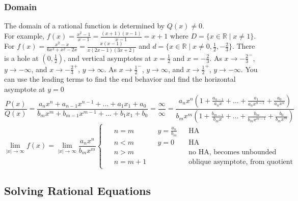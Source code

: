 \documentclass{article}
\begin{document}
	\subsubsection{Domain}
	The domain of a rational function is determined by $Q(x)\neq0$.\\
	For example, $f(x)=\frac{x^2-1}{x-1}=\frac{(x+1)(x-1)}{x-1}=x+1$ where $D=\{x\in\mathbb{R}\mid x\neq1\}$.\\
	For $f(x)=\frac{x^2-x}{6x^3+x^2-2x}=\frac{x(x-1)}{x(2x-1)(3x+2)}$ and $d=\{x\in\mathbb{R}\mid x\neq0, \frac{1}{2}, -\frac{2}{3}\}$. There is a hole at $(0, \frac{1}{2})$, and vertical asymptotes at $x=\frac{1}{2}$ and $x=-\frac{2}{3}$. As $x\to-\frac{2}{3}^-$, $y\to-\infty$, and $x\to-\frac{2}{3}^+$, $y\to\infty$. As $x\to\frac{1}{2}^-$, $y\to\infty$, and $x\to\frac{1}{2}^+$, $y\to-\infty$. You can use the leading terms to find the end behavior and find the horizontal asymptote at $y=0$\\
	\[\frac{{P(x)}}{Q(x)}=\frac{a_nx^n+a_{n-1}x^{n-1}+\dots+a_1x_1+a_0}{b_mx^m+b_{m-1}x^{m-1}+\dots+b_1x_1+b_0}=\frac{\infty}{\infty}=\frac{a_nx^n\left(1+\frac{a_{n-1}}{a_nx}+\dots+\frac{a_1}{a_nx^{n-1}}+\frac{a_0}{a_nx^n}\right)}{{b_mx^m\left(1+\frac{b_{m-1}}{b_mx}+\dots+\frac{b_m}{b_mx^{m-1}}+\frac{b_0}{b_mx^m}\right)}}\]
	\[\lim_{|x|\to\infty}f(x)=\lim_{|x|\to\infty}\frac{a_nx^n}{b_mx^m}
	\begin{cases}\begin{aligned}
		&n=m&&y=\frac{a_n}{b_m}&&\text{HA}\\
		&n<m&&y=0&&\text{HA}\\
		&n>m&&&&\text{no HA, becomes unbounded}\\
		&n=m+1&&&&\text{oblique asymptote, from quotient}
	\end{aligned}\end{cases}\]
	\subsection{Solving Rational Equations}
\end{document}
